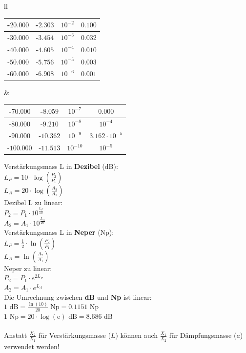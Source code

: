 \begin{tabular}{ll}
{\begin{tabular}{|c|c|c|c|}
	-$20.000$ & -$2.303$ & $10^{-2}$ & $0.100$ \\ \hline
	-$30.000$ & -$3.454$ & $10^{-3}$ & $0.032$ \\ \hline
	-$40.000$ & -$4.605$ & $10^{-4}$ & $0.010$ \\ \hline
	-$50.000$ & -$5.756$ & $10^{-5}$ & $0.003$ \\ \hline
	-$60.000$ & -$6.908$ & $10^{-6}$ & $0.001$ \\ \hline
	\end{tabular}
}
& \parbox{11.5cm}{
	\scriptsize
	\begin{tabular}{|c|c|c|c|}
	\hline
	-$70.000$ & -$8.059$ & $10^{-7}$ & $0.000$ \\ \hline
	-$80.000$ & -$9.210$ & $10^{-8}$ & $10^{-4}$ \\ \hline
	-$90.000$ & -$10.362$ & $10^{-9}$ & $3.162 \cdot 10^{-5}$ \\ \hline
	-$100.000$ & -$11.513$ & $10^{-10}$ & $10^{-5}$ \\ \hline
	\end{tabular}
	\normalsize
Verstärkungsmass L in \textbf{Dezibel} (dB):\\
$L_P = 10 \cdot \log \left(\frac {P_2} {P_1}\right)$ \\
$L_A = 20 \cdot \log \left(\frac {A_2} {A_1}\right)$ \\ 

Dezibel L zu linear: \\
$P_2 = P_1 \cdot 10^{\frac{L_P}{10}} $ \\
$A_2 = A_1 \cdot 10^{\frac{L_A}{20}} $ \\

Verstärkungsmass L in \textbf{Neper} (Np):\\
$L_P = \frac {1}{2} \cdot \ln \left(\frac {P_2} {P_1}\right)$\\
$L_A = \ln \left(\frac {A_2} {A_1} \right)$ \\

Neper zu linear: \\
$P_2 = P_1 \cdot e^{2 L_P}$ \\
$A_2 = A_1 \cdot e^{L_A}$ \\

Die Umrechnung zwischen {\bf dB} und {\bf Np} ist linear: \\
$1\mbox{~dB} = \frac {\ln(10)} {20} \mbox{~Np} = 0.1151\mbox{~Np}$ \\
$1\mbox{~Np} = 20 \cdot \log(\mbox{e}) \mbox{~dB} = 8.686\mbox{~dB}$ \\ 
\\
Anstatt $\frac{X_2}{X_1}$ für Verstärkungsmasse ($L$) können auch
$\frac{X_1}{X_2}$ für Dämpfungsmasse ($a$) verwendet werden!

}
\end{tabular}
